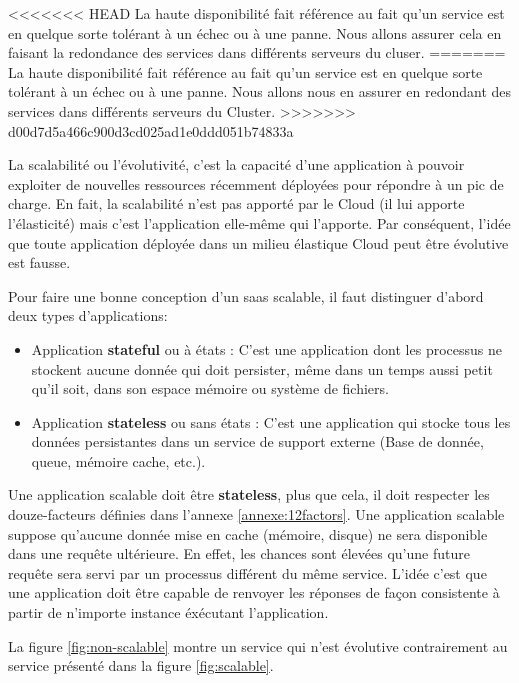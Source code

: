 \begin{onehalfspace}
<<<<<<< HEAD
La haute disponibilité fait référence au fait qu'un service est en quelque sorte tolérant à un échec ou à une panne. Nous allons assurer cela en faisant la redondance des services dans différents serveurs du cluser.
=======
La haute disponibilité fait référence au fait qu'un service est en quelque sorte tolérant à un échec ou à une panne. Nous allons nous en assurer en redondant des services dans différents serveurs du Cluster.
>>>>>>> d00d7d5a466c900d3cd025ad1e0ddd051b74833a

La scalabilité ou l'évolutivité, c'est la capacité d'une application à pouvoir exploiter de nouvelles ressources récemment déployées pour répondre à un pic de charge. En fait, la scalabilité n'est pas apporté par le Cloud (il lui apporte l'élasticité) mais c'est l'application elle-même qui l'apporte. Par conséquent, l'idée que toute application déployée dans un milieu élastique Cloud peut être évolutive est fausse.


Pour faire une bonne conception d'un \acrshort{saas} scalable, il faut distinguer d'abord deux types d'applications:

\begin{itemize}
	\item Application \textbf{stateful} ou à états : C'est une application dont les processus ne stockent aucune donnée qui doit persister, même dans un temps aussi petit qu'il soit, dans son espace mémoire ou système de fichiers.
	\item Application \textbf{stateless} ou sans états : C'est une application qui stocke tous les données persistantes dans un service de support externe (Base de donnée, queue, mémoire cache, etc.).
\end{itemize}

Une application scalable doit être \textbf{stateless}, plus que cela, il doit respecter les douze-facteurs définies dans l'annexe \ref{annexe:12factors}. Une application scalable suppose qu'aucune donnée mise en cache (mémoire, disque) ne sera disponible dans une requête ultérieure. En effet, les chances sont élevées qu'une future requête sera servi par un processus différent du même service. L'idée c'est que une application doit être capable de renvoyer les réponses de façon consistente à partir de n'importe instance éxécutant l'application.



La figure \ref{fig:non-scalable} montre un service qui n'est évolutive contrairement au service présenté dans la figure \ref{fig:scalable}.



\end{onehalfspace}
